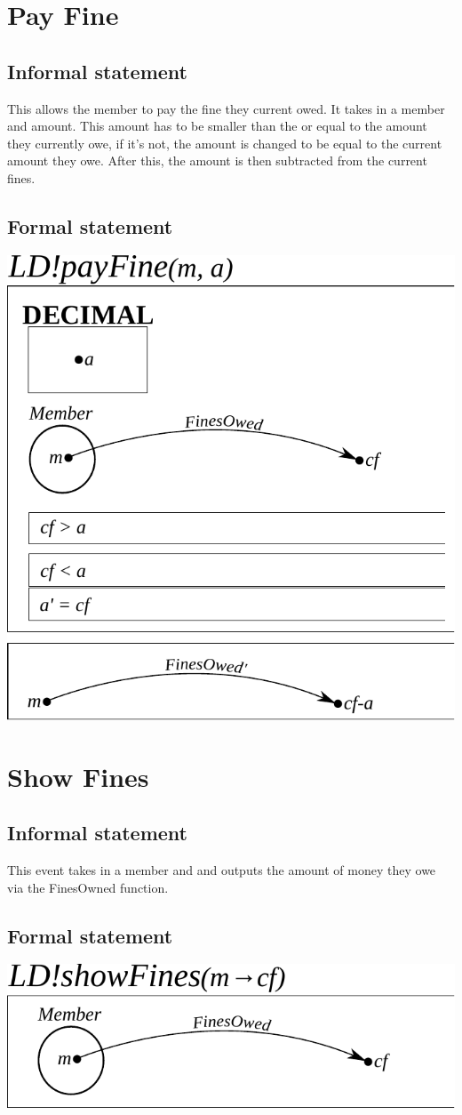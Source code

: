 \documentclass[]{report}
\begin{document}
\section{Pay Fine}
\subsection{Informal statement}
This allows the member to pay the fine they current owed. It takes in a member and amount. This amount has to be smaller than the or equal to the amount they currently owe, if it's not, the amount is changed to be equal to the current amount they owe. After this, the amount is then subtracted from the current fines.
\subsection{Formal statement}
\begin{center}
	\includegraphics{pay_fine.pdf}
\end{center}
\newpage
\section{Show Fines}
\subsection{Informal statement}
This event takes in a member and and outputs the amount of money they owe via the FinesOwned function.
\subsection{Formal statement}
\begin{center}
	\includegraphics{show_fines.pdf}
\end{center}
\newpage
\end{document}
